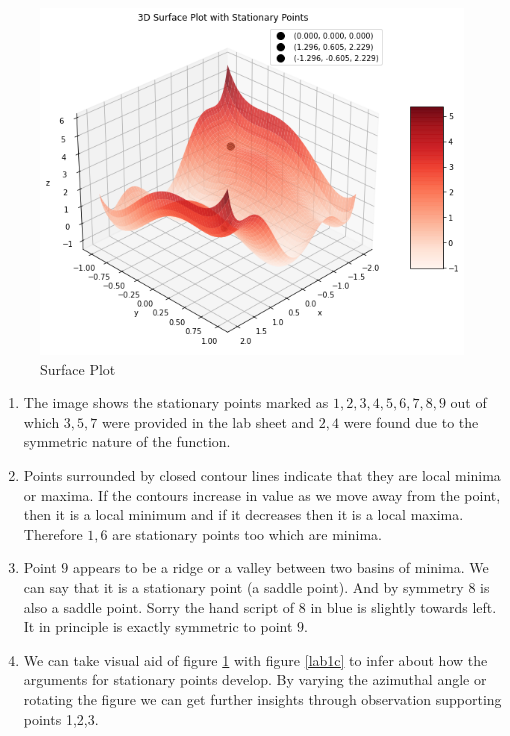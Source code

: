 \documentclass{article}
\begin{document}
\begin{figure}[h]
    \centering
    \includegraphics[width=1\textwidth]{lab1p.png}
    \caption{Surface Plot}
    \label{lab1p}
\end{figure}
\begin{enumerate}
    

 \item The image shows the stationary points marked as \( 1,2,3,4,5,6,7,8, 9\) out of which \(3,5,7\) were provided in the lab sheet and \(2,4\) were found due to the symmetric nature of the function. 

 \item Points surrounded by closed contour lines indicate that they are local minima or maxima. If the contours increase in value as we move away from the point, then it is a local minimum and if it decreases then it is a local maxima. Therefore \(1,6\) are stationary points too which are minima. 

 \item  Point \(9\) appears to be a ridge or a valley between two basins of minima. We can say that it is a stationary point (a saddle point). And by symmetry \(8\) is also a saddle point. Sorry the hand script of \(8\) in blue is slightly towards left. It in principle is exactly symmetric to point \(9\). 
 
 \item We can take visual aid of figure  \ref{lab1p} with figure \ref{lab1c} to infer about how the arguments for stationary points develop. By varying the azimuthal angle or rotating the figure we can get further insights through observation supporting points 1,2,3.
 
\end{enumerate}
\newpage
\end{document}
